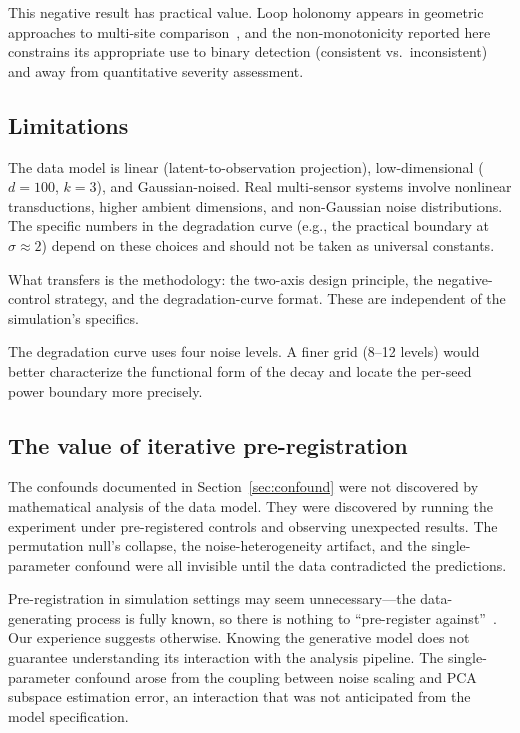 \documentclass[11pt]{article}
\begin{document}
This negative result has practical value.  Loop holonomy appears in
geometric approaches to multi-site
comparison~\citep{bendokat2024grassmann}, and the non-monotonicity
reported here constrains its appropriate use to binary detection
(consistent vs.\ inconsistent) and away from quantitative severity
assessment.

\subsection{Limitations}

The data model is linear (latent-to-observation projection),
low-dimensional ($d = 100$, $k = 3$), and Gaussian-noised.  Real
multi-sensor systems involve nonlinear transductions, higher
ambient dimensions, and non-Gaussian noise distributions.  The
specific numbers in the degradation curve (e.g., the practical
boundary at $\sigma \approx 2$) depend on these choices and should
not be taken as universal constants.

What transfers is the methodology: the two-axis design principle,
the negative-control strategy, and the degradation-curve format.
These are independent of the simulation's specifics.

The degradation curve uses four noise levels.  A finer grid (8--12
levels) would better characterize the functional form of the
decay and locate the per-seed power boundary more precisely.

\subsection{The value of iterative pre-registration}

The confounds documented in Section~\ref{sec:confound} were not
discovered by mathematical analysis of the data model.  They were
discovered by running the experiment under pre-registered controls
and observing unexpected results.  The permutation null's collapse,
the noise-heterogeneity artifact, and the single-parameter
confound were all invisible until the data contradicted the
predictions.

Pre-registration in simulation settings may seem
unnecessary---the data-generating process is fully known, so there
is nothing to ``pre-register
against''~\citep{simmons2011false}.  Our experience suggests
otherwise.  Knowing the generative model does not guarantee
understanding its interaction with the analysis pipeline.  The
single-parameter confound arose from the coupling between noise
scaling and PCA subspace estimation error, an interaction that was
not anticipated from the model specification.
\end{document}
